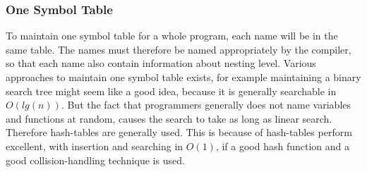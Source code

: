 \subsubsection*{One Symbol Table}
To maintain one symbol table for a whole program, each name will be in the same table. The names must therefore be named appropriately by the compiler, so that each name also contain information about nesting level. Various approaches to maintain one symbol table exists, for example maintaining a binary search tree might seem like a good idea, because it is generally searchable in $O(lg(n))$. But the fact that programmers generally does not name variables and functions at random, causes the search to take as long as linear search. Therefore hash-tables are generally used. This is because of hash-tables perform excellent, with insertion and searching in $O(1)$, if a good hash function and a good collision-handling technique is used.